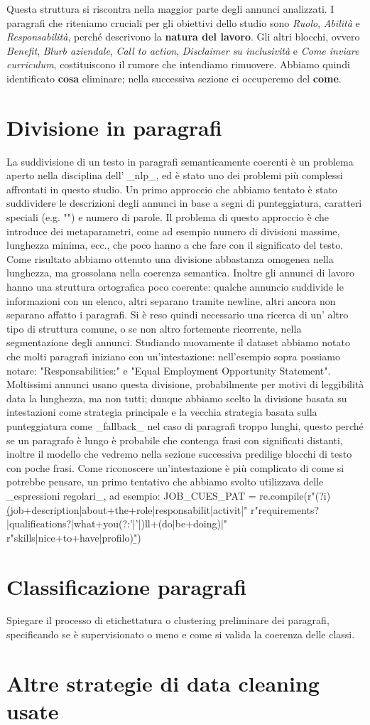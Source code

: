 Questa struttura si riscontra nella maggior parte degli annunci analizzati. I paragrafi che riteniamo cruciali per gli obiettivi dello studio sono \textit{Ruolo}, \textit{Abilità} e \textit{Responsabilità}, perché descrivono la \textbf{natura del lavoro}. Gli altri blocchi, ovvero \textit{Benefit}, \textit{Blurb aziendale}, \textit{Call to action}, \textit{Disclaimer su inclusività} e \textit{Come inviare curriculum}, costituiscono il rumore che intendiamo rimuovere. Abbiamo quindi identificato \textbf{cosa} eliminare; nella successiva sezione ci occuperemo del \textbf{come}.

\section{Divisione in paragrafi}
La suddivisione di un testo in paragrafi semanticamente coerenti è un problema aperto nella disciplina dell' _nlp_, ed è stato uno dei problemi più complessi affrontati in questo studio. Un primo approccio che abbiamo tentato è stato suddividere le descrizioni degli annunci in base a segni di punteggiatura, caratteri speciali (e.g. "\n") e numero di parole. Il problema di questo approccio è che introduce dei metaparametri, come ad esempio numero di divisioni massime, lunghezza minima, ecc., che poco hanno a che fare con il significato del testo. Come risultato abbiamo ottenuto una divisione abbastanza omogenea nella lunghezza, ma grossolana nella coerenza semantica. Inoltre gli annunci di lavoro hanno una struttura ortografica poco coerente: qualche annuncio suddivide le informazioni con un elenco, altri separano tramite newline, altri ancora non separano affatto i paragrafi. Si è reso quindi necessario una ricerca di un' altro tipo di struttura comune, o se non altro fortemente ricorrente, nella segmentazione degli annunci.
Studiando nuovamente il dataset abbiamo notato che molti paragrafi iniziano con un'intestazione: nell'esempio sopra possiamo notare: "Responsabilities:" e "Equal Employment Opportunity Statement". Moltissimi annunci usano questa divisione, probabilmente  per motivi di leggibilità data la lunghezza, ma non tutti; dunque abbiamo scelto la divisione basata su intestazioni come strategia principale e la vecchia strategia basata sulla punteggiatura come _fallback_ nel caso di paragrafi troppo lunghi, questo perché se un paragrafo è lungo è probabile che contenga frasi con significati distanti, inoltre il modello che vedremo nella sezione successiva predilige blocchi di testo con poche frasi.
Come riconoscere un'intestazione è più complicato di come si potrebbe pensare, un primo tentativo che abbiamo svolto utilizzava delle _espressioni regolari_, ad esempio:
JOB_CUES_PAT = re.compile(r"(?i)\b(job\s+description|about\s+the\s+role|responsabilit|activit|"
                          r"requirements?|qualifications?|what\s+you(?:’|'|)ll\s+(do|be\s+doing)|"
                          r"skills|nice\s+to\s+have|profilo)\b")



\section{Classificazione paragrafi}
Spiegare il processo di etichettatura o clustering preliminare dei paragrafi, specificando se è supervisionato o meno e come si valida la coerenza delle classi.

\section{ Altre strategie di data cleaning usate}